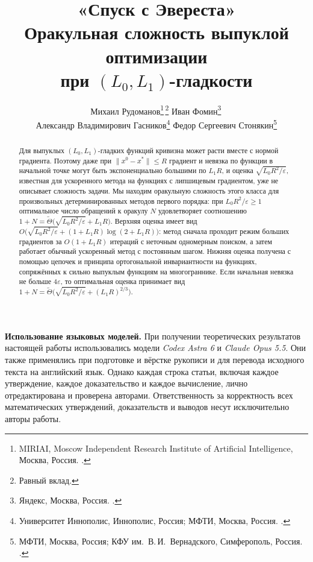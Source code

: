 \documentclass[11pt,a4paper]{article}
\title{«Спуск с Эвереста»\texorpdfstring{\\[3pt]}{: }Оракульная сложность выпуклой оптимизации\texorpdfstring{\\}{ }при \texorpdfstring{$(L_0,L_1)$}{(L0,L1)}-гладкости}
\author{%
  Михаил Рудоманов\thanks{MIRIAI, Moscow Independent Research Institute of Artificial Intelligence, Москва, Россия. \email{rudomanov.ma@phystech.edu}.}\,\thanks{Равный вклад.}\quad
  Иван Фомин\thanks{Яндекс, Москва, Россия. \email{fomin.iva2017@gmail.com}.}\,\footnotemark[2]\\[4pt]
  Александр Владимирович Гасников\thanks{Университет Иннополис, Иннополис, Россия; МФТИ, Москва, Россия. \email{gasnikov@yandex.ru}.}\quad
  Федор Сергеевич Стонякин\thanks{МФТИ, Москва, Россия; КФУ им.~В.\,И.~Вернадского, Симферополь, Россия. \email{fedyor@mail.ru}.}}
\date{}
\newcommand{\norm}[1]{\|#1\|}
\begin{document}
\begingroup
\makeatletter
\renewcommand{\@fnsymbol}[1]{\ensuremath{\ifcase#1\or\spadesuit\or\text{\tiny\faMountain}\or\clubsuit\or\dagger\or\ddagger\fi}}
\let\origmakefntext\@makefntext
\long\def\@makefntext#1{\rightskip\z@\@plus3em\relax\origmakefntext{#1}}
\makeatother
\maketitle
\endgroup

\begin{abstract}
Для выпуклых $(L_0,L_1)$-гладких функций кривизна может расти вместе с нормой градиента. Поэтому даже при $\norm{x^0-x^\ast}\le R$ градиент и невязка по функции в начальной точке могут быть экспоненциально большими по $L_1R$, и оценка $\sqrt{L_0R^2/\varepsilon}$, известная для ускоренного метода на функциях с липшицевым градиентом, уже не описывает сложность задачи. Мы находим оракульную сложность этого класса для произвольных детерминированных методов первого порядка: при $L_0R^2/\varepsilon\ge1$ оптимальное число обращений к оракулу $N$ удовлетворяет соотношению $1+N=\widetilde\Theta\bigl(\sqrt{L_0R^2/\varepsilon}+L_1R\bigr)$. Верхняя оценка имеет вид $O\bigl(\sqrt{L_0R^2/\varepsilon}+(1+L_1R)\log(2+L_1R)\bigr)$: метод сначала проходит режим больших градиентов за $O(1+L_1R)$ итераций с неточным одномерным поиском, а затем работает обычный ускоренный метод с постоянным шагом. Нижняя оценка получена с помощью цепочек и принципа ортогональной инвариантности на функциях, сопряжённых к сильно выпуклым функциям на многограннике. Если начальная невязка не больше $4\varepsilon$, то оптимальная оценка принимает вид $1+N=\widetilde\Theta\bigl(\sqrt{L_0R^2/\varepsilon}+(L_1R)^{2/3}\bigr)$.
\end{abstract}

\begin{tcolorbox}[
  optimbox,
  colback=optimBlue!3!white,
  colframe=optimBlue!40!white,
  borderline west={1.4pt}{0pt}{optimBlue},
  top=7pt,bottom=7pt
]
\small
\noindent\textbf{Использование языковых моделей.}\enspace
При получении теоретических результатов настоящей работы использовались
модели \textit{Codex Astra 6} и \textit{Claude Opus 5.5}.
Они также применялись при подготовке и вёрстке рукописи и для перевода
исходного текста на английский язык.
Однако каждая строка статьи, включая каждое утверждение, каждое
доказательство и каждое вычисление, лично отредактирована и проверена
авторами. Ответственность за корректность всех математических утверждений,
доказательств и выводов несут исключительно авторы работы.
\end{tcolorbox}
\end{document}
